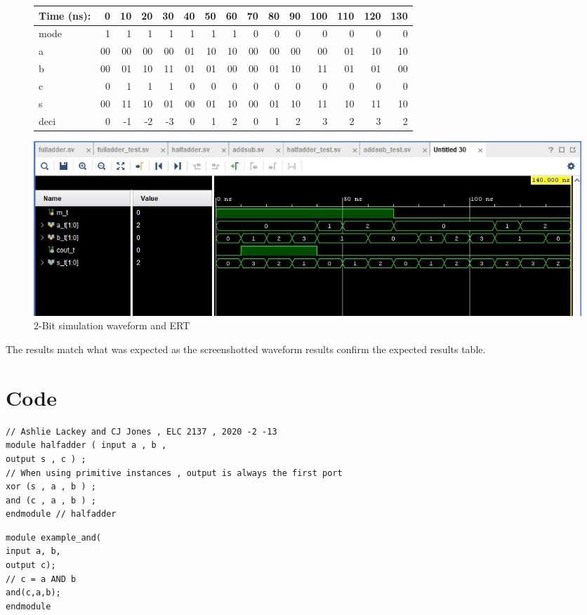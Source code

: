 \documentclass[11pt]{article}
\begin{document}
\begin{figure}[ht]\centering
	\begin{tabular}{l|rrrrrrrrrrrrrr}
		Time (ns): & 0 & 10 & 20 & 30 & 40 & 50 & 60 & 70 & 80 & 90 & 100 & 110 & 120 & 130 \\
		\midrule 
		mode & 1 & 1 & 1 & 1 & 1 & 1 & 1 & 0 & 0 & 0 & 0 & 0 & 0 & 0 \\ 
		a & 00 & 00 & 00 & 00 & 01 & 10 & 10 & 00 & 00 & 00 & 00 & 01 & 10 & 10 \\
		b & 00 & 01 & 10 & 11 & 01 & 01 & 00 & 00 & 01 & 10 & 11 & 01 & 01 & 00\\
		\midrule
		c & 0 & 1 & 1 & 1 & 0 & 0 & 0 & 0 & 0 & 0 & 0 & 0 & 0 & 0 \\
		s & 00 & 11 & 10 & 01 & 00 & 01 & 10 & 00 & 01 & 10 & 11 & 10 & 11 & 10 \\
		deci & 0 & -1 & -2 & -3 & 0 & 1 & 2 & 0 & 1 & 2 & 3 & 2 & 3 & 2 \\
		\bottomrule
	\end{tabular}\medskip
	
	\includegraphics[width=1.0\textwidth]{AddSubReal}
	\caption{2-Bit simulation waveform and ERT}
	\label{fig:sim_with_table}
\end{figure}

\clearpage

The results match what was expected as the screenshotted waveform results confirm the expected results table. 
\section*{Code}
\begin{lstlisting}[style=Verilog,caption=Half Adder Design Code,label=code:ex ]
// Ashlie Lackey and CJ Jones , ELC 2137 , 2020 -2 -13
module halfadder ( input a , b ,
output s , c ) ;
// When using primitive instances , output is always the first port
xor (s , a , b ) ;
and (c , a , b ) ;
endmodule // halfadder

\end{lstlisting}

\begin{lstlisting}[style=Verilog,caption=Half Adder Testbench Code,label=code:ex ]
module example_and(
input a, b,
output c);
// c = a AND b
and(c,a,b);
endmodule
\end{lstlisting}
\end{document}
